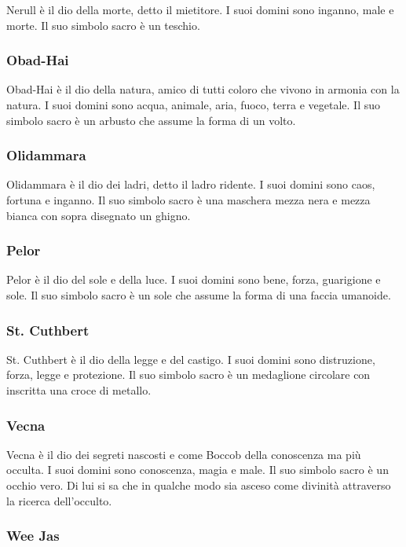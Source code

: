 \documentclass[a4paper,12pt]{book}
\begin{document}
Nerull è il dio della morte, detto il mietitore.
I suoi domini sono inganno, male e morte.
Il suo simbolo sacro è un teschio.

\subsubsection{Obad-Hai}

Obad-Hai è il dio della natura, amico di tutti coloro che vivono in armonia con la natura.
I suoi domini sono acqua, animale, aria, fuoco, terra e vegetale.
Il suo simbolo sacro è un arbusto che assume la forma di un volto.

\subsubsection{Olidammara}

Olidammara è il dio dei ladri, detto il ladro ridente.
I suoi domini sono caos, fortuna e inganno.
Il suo simbolo sacro è una maschera mezza nera e mezza bianca con sopra disegnato un ghigno.

\subsubsection{Pelor}

Pelor è il dio del sole e della luce.
I suoi domini sono bene, forza, guarigione e sole.
Il suo simbolo sacro è un sole che assume la forma di una faccia umanoide.

\subsubsection{St. Cuthbert}

St. Cuthbert è il dio della legge e del castigo.
I suoi domini sono distruzione, forza, legge e protezione.
Il suo simbolo sacro è un medaglione circolare con inscritta una croce di metallo.

\subsubsection{Vecna}

Vecna è il dio dei segreti nascosti e come Boccob della conoscenza ma più occulta.
I suoi domini sono conoscenza, magia e male.
Il suo simbolo sacro è un occhio vero.
Di lui si sa che in qualche modo sia asceso come divinità attraverso la ricerca dell'occulto.

\subsubsection{Wee Jas}
\end{document}
